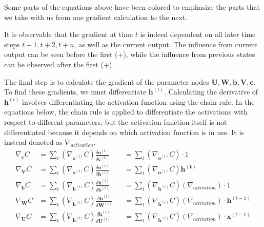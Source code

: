 \documentclass[12pt]{article}
\begin{document}
Some parts of the equations above have been colored to emphasize the parts that we take with us from one gradient calculation to the next. \par
It is observable that the gradient at time $t$ is indeed dependent on all later time steps $t + 1, t + 2, t + n$, as well as the current output. The influence from current output can be seen before the first (+), while the influence from previous states can be observed after the first (+). \par

The final step is to calculate the gradient of the parameter nodes $\mathbf{U, W, b, V, c}$. To find these gradients, we must differentiate $\mathbf{h}^{(t)}$. Calculating the derivative of $\mathbf{h}^{(t)}$ involves differentiating the activation function using the chain rule. In the equations below, the chain rule is applied to differentiate the activations with respect to different parameters, but the activation function itself is not differentiated because it depends on which activation function is in use. It is instead denoted as $\nabla_{activation}$.
\begin{align*}
    \nabla_\mathbf{c}C &= \sum_t \left(\nabla_{\mathbf{o}^{(t)}}C\right) \frac{\delta \mathbf{o}^{(t)}}{\delta \mathbf{c}^{(t)}} &&= \sum_t \left(\nabla_{\mathbf{o}^{(t)}}C\right) \cdot 1 \\
    \nabla_\mathbf{V}C &= \sum_t \left(\nabla_{\mathbf{o}^{(t)}}C\right) \frac{\delta \mathbf{o}^{(t)}}{\delta \mathbf{h}^{(t)}} &&= \sum_t \left(\nabla_{\mathbf{o}^{(t)}}C\right)\mathbf{h^{(t)}} \\
    \nabla_\mathbf{b}C &= \sum_t \left(\nabla_{\mathbf{h}^{(t)}}C\right) \frac{\delta \mathbf{h}^{(t)}}{\delta \mathbf{b}^{(t)}} &&= \sum_t \left(\nabla_{\mathbf{h}^{(t)}}C\right) \left(\nabla_{activation}\right) \cdot 1 \\
    \nabla_\mathbf{W}C &= \sum_t \left(\nabla_{\mathbf{h}^{(t)}}C\right) \frac{\delta \mathbf{h}^{(t)}}{\delta \mathbf{W}^{(t)}} &&= \sum_t \left(\nabla_{\mathbf{h}^{(t)}}C\right) \left(\nabla_{activation}\right) \cdot \mathbf{h}^{(t-1)} \\
    \nabla_\mathbf{U}C &= \sum_t \left(\nabla_{\mathbf{h}^{(t)}}C\right) \frac{\delta \mathbf{h}^{(t)}}{\delta \mathbf{U}^{(t)}} &&= \sum_t \left(\nabla_{\mathbf{h}^{(t)}}C\right) \left(\nabla_{activation}\right) \cdot \mathbf{x}^{(t-1)}\\
\end{align*}
\end{document}
